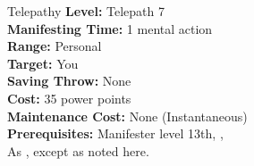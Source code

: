 {Telepathy}
{
	\textbf{Level:}
	Telepath 7\\
	\textbf{Manifesting Time:}
	1 mental action\\
	\textbf{Range:}
	Personal\\
	\textbf{Target:}
	You\\
	\textbf{Saving Throw:}
	None\\
	\textbf{Cost:}
	35 power points\\
	\textbf{Maintenance Cost:}
	None (Instantaneous)\\
	\textbf{Prerequisites:}
	Manifester level 13th, , \\
}
{
	As , except as noted here.
}